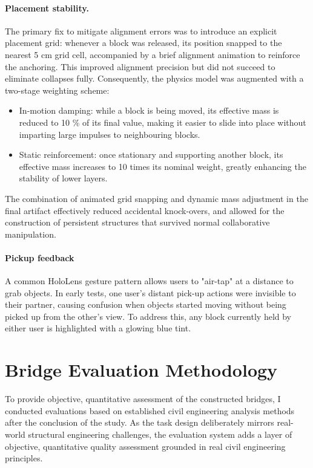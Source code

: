 \paragraph{Placement stability.}
The primary fix to mitigate alignment errors was to introduce an explicit placement grid: whenever a block was released, its position snapped to the nearest 5 cm grid cell, accompanied by a brief alignment animation to reinforce the anchoring. This improved alignment precision but did not succeed to eliminate collapses fully. Consequently, the physics model was augmented with a two-stage weighting scheme:
\begin{itemize}
\item In-motion damping: while a block is being moved, its effective mass is reduced to 10 \% of its final value, making it easier to slide into place without imparting large impulses to neighbouring blocks.
\item Static reinforcement: once stationary and supporting another block, its effective mass increases to 10 times its nominal weight, greatly enhancing the stability of lower layers.
\end{itemize}
The combination of animated grid snapping and dynamic mass adjustment in the final artifact effectively reduced accidental knock-overs, and allowed for the construction of persistent structures that survived normal collaborative manipulation.

\paragraph{Pickup feedback}
A common HoloLens gesture pattern allows users to "air-tap" at a distance to grab objects. In early tests, one user's distant pick-up actions were invisible to their partner, causing confusion when objects started moving without being picked up from the other's view. To address this, any block currently held by either user is highlighted with a glowing blue tint.

\section{Bridge Evaluation Methodology}

To provide objective, quantitative assessment of the constructed bridges, I conducted evaluations based on established civil engineering analysis methods after the conclusion of the study. As the task design deliberately mirrors real-world structural engineering challenges, the evaluation system adds a layer of objective, quantitative quality assessment grounded in real civil engineering principles.

